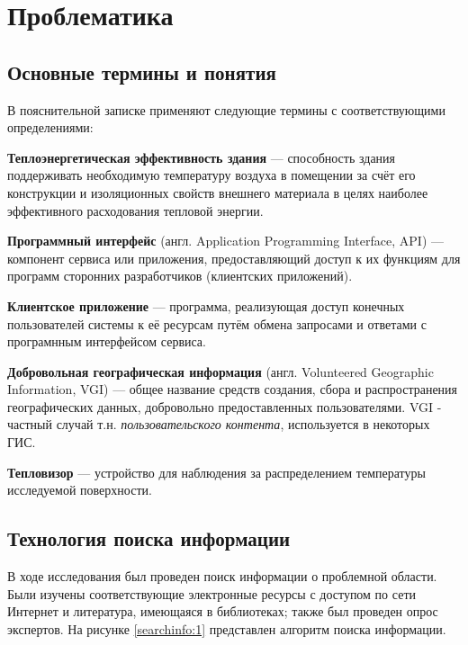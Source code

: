 \chapter{Проблематика}

\section{Основные термины и понятия}

В пояснительной записке применяют следующие термины с соответствующими определениями:

\textbf{Теплоэнергетическая эффективность здания} --- способность здания поддерживать необходимую температуру воздуха в помещении за счёт его конструкции и изоляционных свойств внешнего материала в целях наиболее эффективного расходования тепловой энергии.

\textbf{Программный интерфейс} (англ. Application Programming Interface, API) --- компонент сервиса или приложения, предоставляющий доступ к их функциям для программ сторонних разработчиков (клиентских приложений).

\textbf{Клиентское приложение} --- программа, реализующая доступ конечных пользователей системы к её ресурсам путём обмена запросами и ответами с програмнным интерфейсом сервиса. 

\textbf{Добровольная географическая информация} (англ. Volunteered Geographic Information, VGI) --- общее название средств создания, сбора и распространения географических данных, добровольно предоставленных пользователями. VGI - частный случай т.н. \textit{пользовательского контента}, используется в некоторых ГИС.

\textbf{Тепловизор} --- устройство для наблюдения за распределением температуры исследуемой поверхности.

\pagebreak

\section{Технология поиска информации}

\par
	
	В ходе исследования был проведен поиск информации о проблемной области. Были изучены соответствующие электронные ресурсы с доступом по сети Интернет и литература, имеющаяся в библиотеках; также был проведен опрос экспертов. На рисунке \ref{searchinfo:1} представлен алгоритм поиска информации.

